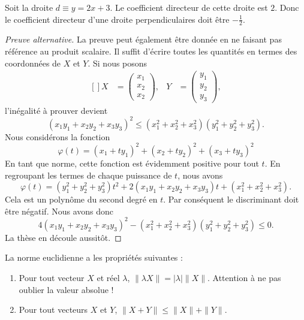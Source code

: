 \begin{example}
	Soit la droite $d\equiv y=2x+3$. Le coefficient directeur de cette droite est $2$. Donc le coefficient directeur d'une droite perpendiculaires doit être $-\frac{ 1 }{ 2 }$.
\end{example}

\begin{proof}[Preuve alternative]
	La preuve peut également être donnée en ne faisant pas référence au produit scalaire. Il suffit d'écrire toutes les quantités en termes des coordonnées de $X$ et $Y$. Si nous posons
	\begin{equation}
		\begin{aligned}[]
			X&=\begin{pmatrix}
				x_1	\\
				x_2	\\
				x_2
			\end{pmatrix},
			&Y&=\begin{pmatrix}
				y_1	\\
				y_2	\\
				y_3
			\end{pmatrix},
		\end{aligned}
	\end{equation}
	l'inégalité à prouver devient
	\begin{equation}
		(x_1y_1+x_2y_2+x_3y_3)^2\leq (x_1^2+x_2^2+x_3^2)(y_1^2+y_2^2+y_3^2).
	\end{equation}
	Nous considérons la fonction
	\begin{equation}
		\varphi(t)=(x_1+ty_1)^2+(x_2+ty_2)^2+(x_3+ty_3)^2
	\end{equation}
	En tant que norme, cette fonction est évidemment positive pour tout $t$. En regroupant les termes de chaque puissance de $t$, nous avons
	\begin{equation}
		\varphi(t)=(y_1^2+y_2^2+y_3^2)t^2+2(x_1y_1+x_2y_2+x_3y_3)t+(x_1^2+x_2^2+x_3^2).
	\end{equation}
	Cela est un polynôme du second degré en $t$. Par conséquent le discriminant doit être négatif. Nous avons donc
	\begin{equation}
		4(x_1y_1+x_2y_2+x_3y_3)^2-(x_1^2+x_2^2+x_3^2)(y_1^2+y_2^2+y_3^2)\leq 0.
	\end{equation}
	La thèse en découle aussitôt.
\end{proof}

\begin{proposition}     \label{PROPooVSVMooZrqxdc}
	La norme euclidienne a les propriétés suivantes :
	\begin{enumerate}
		\item
			Pour tout vecteur $X$ et réel $\lambda$,  $\| \lambda X \|=| \lambda |\| X \|$. Attention à ne pas oublier la valeur absolue !
		\item
			Pour tout vecteurs $X$ et $Y$, $\| X+Y \|\leq \| X \|+\| Y \|$.
	\end{enumerate}
\end{proposition}

